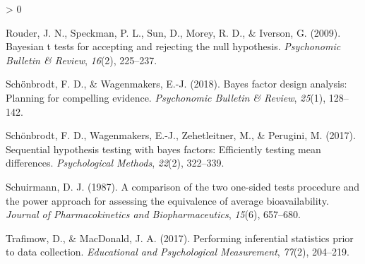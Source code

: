 \documentclass[
  english,
  man,floatsintext]{apa6}
\newlength{\cslhangindent}
\newenvironment{CSLReferences}[2] %
 {%
  \setlength{\parindent}{0pt}
  \ifodd #1 \everypar{\setlength{\hangindent}{\cslhangindent}}\ignorespaces\fi
  \ifnum #2 > 0
  \setlength{\parskip}{#2\baselineskip}
  \fi
 }%
 {}
\begin{document}
\begin{CSLReferences}{1}{0}
\leavevmode\hypertarget{ref-rouder_bayesian_2009}{}%
Rouder, J. N., Speckman, P. L., Sun, D., Morey, R. D., \& Iverson, G. (2009). Bayesian t tests for accepting and rejecting the null hypothesis. \emph{Psychonomic Bulletin \& Review}, \emph{16}(2), 225--237.

\leavevmode\hypertarget{ref-schonbrodt_bayes_2018}{}%
Schönbrodt, F. D., \& Wagenmakers, E.-J. (2018). Bayes factor design analysis: Planning for compelling evidence. \emph{Psychonomic Bulletin \& Review}, \emph{25}(1), 128--142.

\leavevmode\hypertarget{ref-schonbrodt_sequential_2017}{}%
Schönbrodt, F. D., Wagenmakers, E.-J., Zehetleitner, M., \& Perugini, M. (2017). Sequential hypothesis testing with bayes factors: Efficiently testing mean differences. \emph{Psychological Methods}, \emph{22}(2), 322--339.

\leavevmode\hypertarget{ref-schuirmann_comparison_1987}{}%
Schuirmann, D. J. (1987). A comparison of the two one-sided tests procedure and the power approach for assessing the equivalence of average bioavailability. \emph{Journal of Pharmacokinetics and Biopharmaceutics}, \emph{15}(6), 657--680.

\leavevmode\hypertarget{ref-trafimow_performing_2017}{}%
Trafimow, D., \& MacDonald, J. A. (2017). Performing inferential statistics prior to data collection. \emph{Educational and Psychological Measurement}, \emph{77}(2), 204--219.

\end{CSLReferences}

\endgroup
\end{document}
